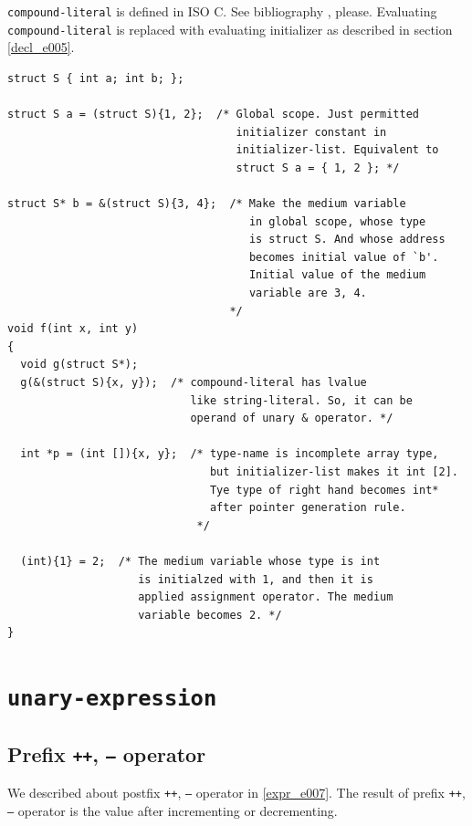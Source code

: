 {\tt{compound-literal}} is defined in ISO C.
See bibliography \cite{ISO}, please.
Evaluating {\tt{compound-literal}} is replaced with
evaluating initializer as described in section \ref{decl_e005}.
\begin{verbatim}
struct S { int a; int b; };

struct S a = (struct S){1, 2};  /* Global scope. Just permitted
                                   initializer constant in 
                                   initializer-list. Equivalent to
                                   struct S a = { 1, 2 }; */

struct S* b = &(struct S){3, 4};  /* Make the medium variable
                                     in global scope, whose type
                                     is struct S. And whose address
                                     becomes initial value of `b'.
                                     Initial value of the medium
                                     variable are 3, 4.
                                  */
void f(int x, int y)
{
  void g(struct S*);
  g(&(struct S){x, y});  /* compound-literal has lvalue
                            like string-literal. So, it can be
                            operand of unary & operator. */

  int *p = (int []){x, y};  /* type-name is incomplete array type,
                               but initializer-list makes it int [2].
                               Tye type of right hand becomes int*
                               after pointer generation rule.
                             */

  (int){1} = 2;  /* The medium variable whose type is int
                    is initialzed with 1, and then it is
                    applied assignment operator. The medium
                    variable becomes 2. */
}
\end{verbatim}

\section{\tt{unary-expression}}
\label{expr_e008}

\subsection{Prefix {\tt{++}}, {\tt{--}} operator}

We described about postfix {\tt{++}}, {\tt{--}} operator in
\ref{expr_e007}.
The result of prefix {\tt{++}}, {\tt{--}} operator is
the value after incrementing or decrementing.

